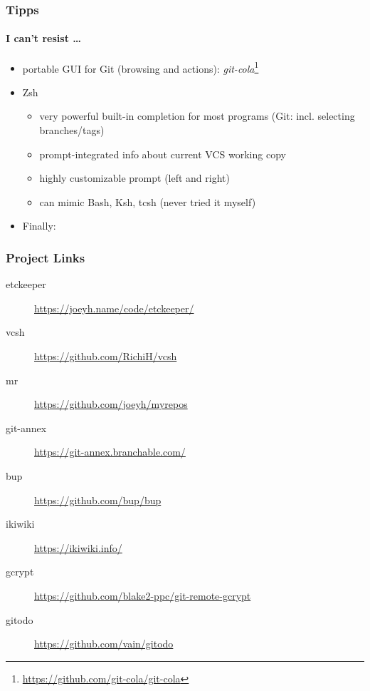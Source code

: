 \documentclass[english,hyperref={pdfpagelabels=false},aspectratio=169]{beamer}
\begin{document}
\begin{frame}[label=tipps]
  \frametitle{Tipps}
  \framesubtitle{I can't resist \dots}
  \begin{itemize}
    \item portable GUI for Git {\scriptsize\color{fzjgray50}(browsing and actions)}: \textit{git-cola}\footnote{\tiny\url{https://github.com/git-cola/git-cola}}
    \item Zsh
      \begin{itemize}
        \item very powerful built-in completion for most programs {\scriptsize\color{fzjgray50}(Git: incl. selecting branches/tags)}
        \item prompt-integrated info about current VCS working copy
        \item highly customizable prompt {\scriptsize\color{fzjgray50}(left and right)}
        \item can mimic Bash, Ksh, tcsh {\scriptsize\color{fzjgray50}(never tried it myself)}
      \end{itemize}
    \item Finally:
      \begin{center}
      \end{center}
  \end{itemize}
\end{frame}


\begin{frame}
  \frametitle{Project Links}
  \begin{description}
    \item[etckeeper] \url{https://joeyh.name/code/etckeeper/}
    \item[vcsh] \url{https://github.com/RichiH/vcsh}
    \item[mr] \url{https://github.com/joeyh/myrepos}
    \item[git-annex] \url{https://git-annex.branchable.com/}
    \item[bup] \url{https://github.com/bup/bup}
    \item[ikiwiki] \url{https://ikiwiki.info/}
    \item[gcrypt] \url{https://github.com/blake2-ppc/git-remote-gcrypt}
    \item[gitodo] \url{https://github.com/vain/gitodo}
  \end{description}
\end{frame}
\end{document}
